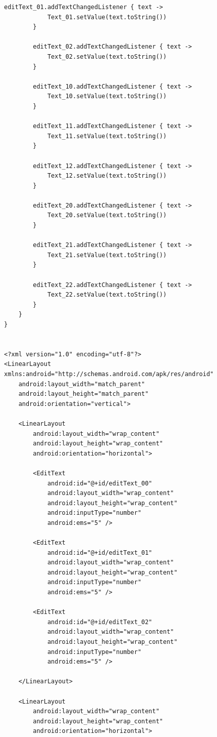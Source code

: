 \documentclass[a4paper, 14pt]{extarticle}
\begin{document}
\begin{lstlisting}[language={},caption={},label={lst:code1}]
        editText_01.addTextChangedListener { text ->
            Text_01.setValue(text.toString())
        }

        editText_02.addTextChangedListener { text ->
            Text_02.setValue(text.toString())
        }

        editText_10.addTextChangedListener { text ->
            Text_10.setValue(text.toString())
        }

        editText_11.addTextChangedListener { text ->
            Text_11.setValue(text.toString())
        }

        editText_12.addTextChangedListener { text ->
            Text_12.setValue(text.toString())
        }

        editText_20.addTextChangedListener { text ->
            Text_20.setValue(text.toString())
        }

        editText_21.addTextChangedListener { text ->
            Text_21.setValue(text.toString())
        }

        editText_22.addTextChangedListener { text ->
            Text_22.setValue(text.toString())
        }
    }
}


<?xml version="1.0" encoding="utf-8"?>
<LinearLayout xmlns:android="http://schemas.android.com/apk/res/android"
    android:layout_width="match_parent"
    android:layout_height="match_parent"
    android:orientation="vertical">

    <LinearLayout
        android:layout_width="wrap_content"
        android:layout_height="wrap_content"
        android:orientation="horizontal">

        <EditText
            android:id="@+id/editText_00"
            android:layout_width="wrap_content"
            android:layout_height="wrap_content"
            android:inputType="number"
            android:ems="5" />

        <EditText
            android:id="@+id/editText_01"
            android:layout_width="wrap_content"
            android:layout_height="wrap_content"
            android:inputType="number"
            android:ems="5" />

        <EditText
            android:id="@+id/editText_02"
            android:layout_width="wrap_content"
            android:layout_height="wrap_content"
            android:inputType="number"
            android:ems="5" />

    </LinearLayout>

    <LinearLayout
        android:layout_width="wrap_content"
        android:layout_height="wrap_content"
        android:orientation="horizontal">


\end{lstlisting}
\end{document}
